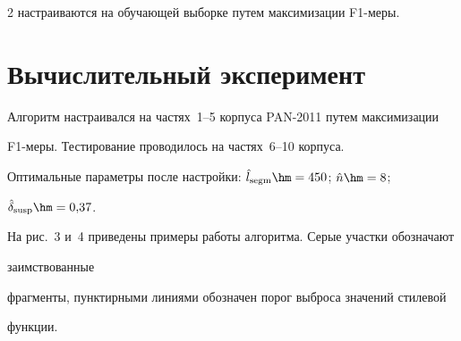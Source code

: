 \begin{multicols}{2}
настраиваются на обучающей выборке путем максимизации {F1-меры}.



\vspace*{-6pt}



\section{Вычислительный эксперимент}



Алгоритм настраивался на частях~1--5 корпуса PAN-2011 путем максимизации 

{F1-ме\-ры}. Тестирование проводилось на частях~6--10 корпуса.

Оптимальные параметры после настройки: $\hat{l}_{\mathrm{segm}}\hm=450$; $\hat{n}\hm=8$; 

$\hat{\delta}_{\mathrm{susp}}\hm=0{,}37$.







На рис.~3 и~4 приведены примеры работы алгоритма. Серые участки обозначают 

заимствованные %

 фрагменты, пунктирными линиями обозначен порог выброса значений стилевой 

функции.






\end{multicols}




